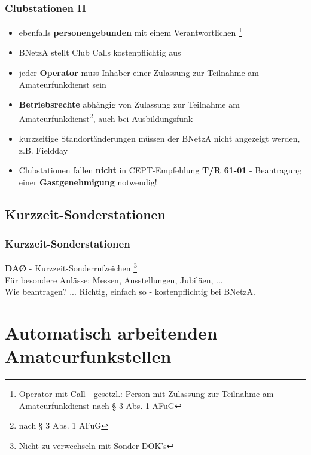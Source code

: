 \begin{frame}
    \frametitle{Clubstationen II}

    \begin{itemize}[<+->]
        \item ebenfalls \textbf{personengebunden} mit einem Verantwortlichen
              \footnote{Operator mit Call - gesetzl.: Person mit Zulassung zur
              Teilnahme am Amateurfunkdienst nach § 3 Abs. 1 AFuG}
        \item BNetzA stellt Club Calls kostenpflichtig aus
        \item jeder \textbf{Operator} muss Inhaber einer Zulassung zur Teilnahme am
              Amateurfunkdienst sein
        \item \textbf{Betriebsrechte} abhängig von Zulassung zur Teilnahme am
              Amateurfunkdienst\footnote{nach § 3 Abs. 1 AFuG}, auch bei Ausbildungsfunk
        \item kurzzeitige Standortänderungen müssen der BNetzA nicht angezeigt
              werden, z.B. Fieldday
        \item Clubstationen fallen \textbf{nicht} in CEPT-Empfehlung \textbf{T/R
              61-01} - Beantragung einer \textbf{Gastgenehmigung} notwendig!
    \end{itemize}

\end{frame}

\subsection{Kurzzeit-Sonderstationen}

\begin{frame}
    \frametitle{Kurzzeit-Sonderstationen}

    \textbf{DAØ} - Kurzzeit-Sonderrufzeichen
    \footnote{Nicht zu verwechseln mit Sonder-DOK's}\\[1em]

    Für besondere Anlässe: Messen, Ausstellungen, Jubiläen, ... \\[3em]

    Wie beantragen? ... Richtig, einfach so - kostenpflichtig bei BNetzA.

\end{frame}

\section{Automatisch arbeitenden Amateurfunkstellen}

